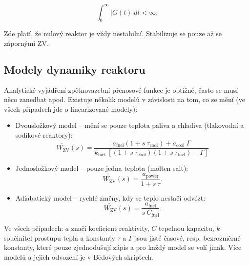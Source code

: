 \begin{equation}
  \boxed{
    \int_0^\infty  |G(t)| dt < \infty.
  }
\end{equation}

Zde platí, že nulový reaktor je vždy nestabilní. Stabilizuje se pouze až se zápornými ZV.

\subsection{Modely dynamiky reaktoru}

Analytické vyjádření zpětnovazební přenosové funkce je obtížné, často se musí něco zanedbat apod. Existuje několik modelů v závislosti na tom, co se mění (ve všech případech jde o linearizované modely):

\begin{itemize}
  \item Dvousložkový model -- mění se pouze teplota paliva a chladiva (tlakovodní a sodíkové reaktory):\\
  $$ \tilde{W_\text{ZV}}(s) = \dfrac{a_\text{fuel} (1 + s \: \tau_\text{cool}) + a_\text{cool} \: \Gamma}{k_\text{fuel} \: [(1 + s \: \tau_\text{cool})(1 + s \: \tau_\text{fuel}) - \Gamma]} $$
  \item Jednosložkový model -- pouze jedna teplota (molten salt):\\
  $$ \tilde{W_\text{ZV}}(s) = \dfrac{a_\text{power}}{1 + s \: \tau}. $$
  \item Adiabatický model -- rychlé změny, kdy se teplo nestačí odvézt:\\
  $$ \tilde{W_\text{ZV}}(s) = \dfrac{a_\text{fuel}}{s \: C_\text{fuel}}. $$
\end{itemize}

Ve všech případech: $a$ značí koeficient reaktivity, $C$ tepelnou kapacitu, $k$ součinitel prostupu tepla a konstanty $\tau$ a $\Gamma$ jsou jisté časové, resp. bezrozměrné konstanty, které pouze zjednodušují zápis a pro každý model se volí jinak. Více modelů a jejich odvození je v Bédových skriptech.

